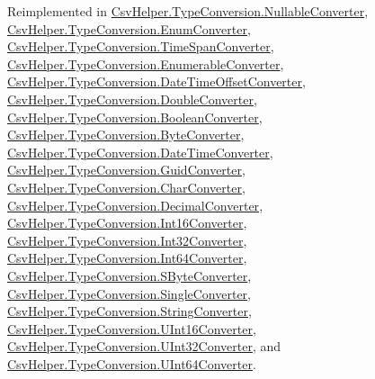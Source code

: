 Reimplemented in \hyperlink{a00114_addb6dc12d4927204cd2349202db63e74}{Csv\-Helper.\-Type\-Conversion.\-Nullable\-Converter}, \hyperlink{a00075_abbbd7ece803a97b4714445c745918dc9}{Csv\-Helper.\-Type\-Conversion.\-Enum\-Converter}, \hyperlink{a00146_a0f2536c88227a94822d0b7730eedf3eb}{Csv\-Helper.\-Type\-Conversion.\-Time\-Span\-Converter}, \hyperlink{a00076_a692617638507cd1033728d7f718fcd2a}{Csv\-Helper.\-Type\-Conversion.\-Enumerable\-Converter}, \hyperlink{a00063_aa69835fc086d80a8eabe7ac50cb92f47}{Csv\-Helper.\-Type\-Conversion.\-Date\-Time\-Offset\-Converter}, \hyperlink{a00074_a0c93a63f9f954646172a65b432c40c69}{Csv\-Helper.\-Type\-Conversion.\-Double\-Converter}, \hyperlink{a00023_abc77c631974272fd1dfe3fe4fcc3bf28}{Csv\-Helper.\-Type\-Conversion.\-Boolean\-Converter}, \hyperlink{a00024_a6176d20d761abfc0af4e840553ffae47}{Csv\-Helper.\-Type\-Conversion.\-Byte\-Converter}, \hyperlink{a00062_a6b1b54cb2d1b200beb8fa3c63e4c064a}{Csv\-Helper.\-Type\-Conversion.\-Date\-Time\-Converter}, \hyperlink{a00084_ad00786c329498785bbb77407ea023877}{Csv\-Helper.\-Type\-Conversion.\-Guid\-Converter}, \hyperlink{a00026_a7cf201b75714eccdc084b6cc3161bf29}{Csv\-Helper.\-Type\-Conversion.\-Char\-Converter}, \hyperlink{a00064_a07444e6f2bb1e49288f9de3b2407dc4f}{Csv\-Helper.\-Type\-Conversion.\-Decimal\-Converter}, \hyperlink{a00094_aff576c6ca9bb1942fb17e385befb0197}{Csv\-Helper.\-Type\-Conversion.\-Int16\-Converter}, \hyperlink{a00095_a392314cc9b5f5b4ad176d0f1a99af32f}{Csv\-Helper.\-Type\-Conversion.\-Int32\-Converter}, \hyperlink{a00096_a9080b7b6a5abc7d8271ffb6924c31b7c}{Csv\-Helper.\-Type\-Conversion.\-Int64\-Converter}, \hyperlink{a00132_ad16aeb03f418c89b3f78e95b46a46b40}{Csv\-Helper.\-Type\-Conversion.\-S\-Byte\-Converter}, \hyperlink{a00135_a5c8a692325c19551246a589e9ca4a1e1}{Csv\-Helper.\-Type\-Conversion.\-Single\-Converter}, \hyperlink{a00141_a50bf35ff93e01df630a9c5e3c7b7569f}{Csv\-Helper.\-Type\-Conversion.\-String\-Converter}, \hyperlink{a00156_a796e0b7b57d69abee122947166b45a9a}{Csv\-Helper.\-Type\-Conversion.\-U\-Int16\-Converter}, \hyperlink{a00157_a15686325b6bfa7648b65f201ecf50cd2}{Csv\-Helper.\-Type\-Conversion.\-U\-Int32\-Converter}, and \hyperlink{a00158_a1d3e86ea3d34de0d47a365c9b8622eb7}{Csv\-Helper.\-Type\-Conversion.\-U\-Int64\-Converter}.


